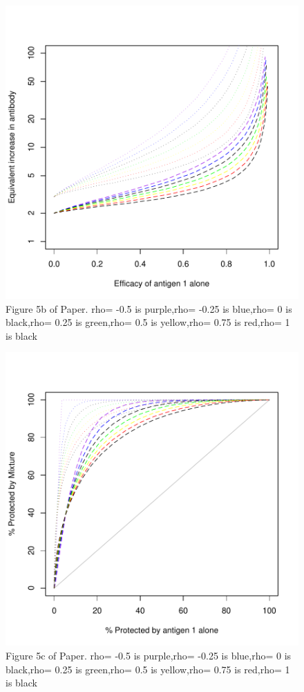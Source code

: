 \documentclass{article}[12pt]
\begin{document}
\begin{figure}
\caption{Figure 5b of Paper.
rho= -0.5  is  purple,rho= -0.25  is  blue,rho= 0  is  black,rho= 0.25  is  green,rho= 0.5  is  yellow,rho= 0.75  is  red,rho= 1  is  black
 \label{fig:5b} }
\includegraphics{hbimdetails-fig5b}
\end{figure}

\begin{figure}
\caption{Figure 5c of Paper.
rho= -0.5  is  purple,rho= -0.25  is  blue,rho= 0  is  black,rho= 0.25  is  green,rho= 0.5  is  yellow,rho= 0.75  is  red,rho= 1  is  black
 \label{fig:5c} }
\includegraphics{hbimdetails-fig5c}
\end{figure}
\end{document}

